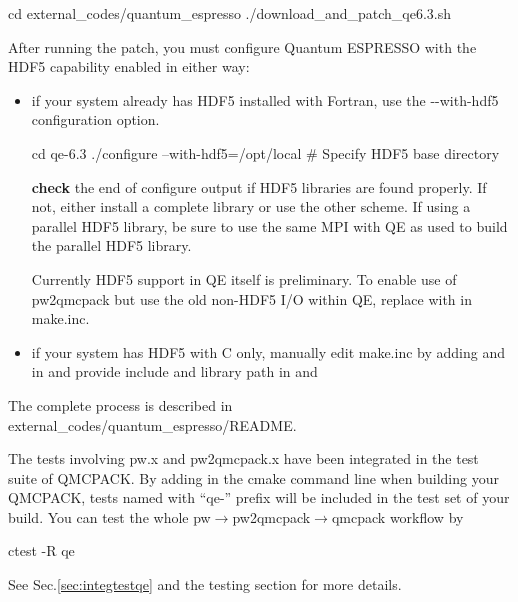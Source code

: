 \begin{shade}
cd external_codes/quantum_espresso
./download_and_patch_qe6.3.sh
\end{shade}
After running the patch, you must configure Quantum ESPRESSO with
the HDF5 capability enabled in either way:
\begin{itemize}
\item if your system already has HDF5 installed with Fortran, use the -{}-with-hdf5 configuration option.

\begin{shade}
cd qe-6.3
./configure --with-hdf5=/opt/local   # Specify HDF5 base directory
\end{shade}
   {\bf check} the end of configure output if HDF5 libraries are found properly.
   If not, either install a complete library or use the other scheme. If using a parallel HDF5 library, be sure to use
   the same MPI with QE as used to build the parallel HDF5 library.

   Currently HDF5 support in QE itself is preliminary. To enable use of pw2qmcpack
   but use the old non-HDF5 I/O within QE, replace  with  in make.inc.
\item if your system has HDF5 with C only, manually edit make.inc by adding  and 
   in  and provide include and library path in  and 
\end{itemize}

The complete process is described in external\_codes/quantum\_espresso/README.

The tests involving pw.x and pw2qmcpack.x have been integrated in the test suite of QMCPACK.
By adding  in the cmake command line when building your QMCPACK,
tests named with ``qe-'' prefix will be included in the test set of your build.
You can test the whole pw$\to$pw2qmcpack$\to$qmcpack workflow by

\begin{shade}
ctest -R qe
\end{shade}
See Sec.\ref{sec:integtestqe} and the testing section for more details.

